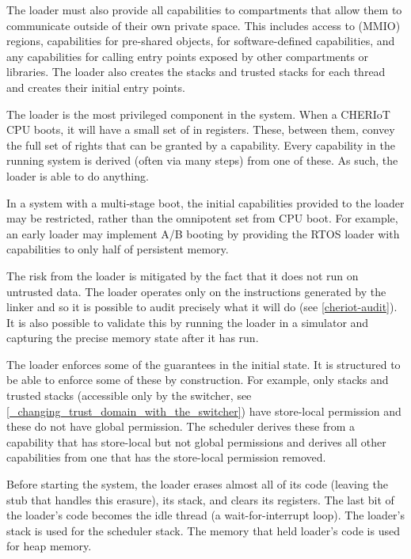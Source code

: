 The loader must also provide all capabilities to compartments that allow them to communicate outside of their own private space.
This includes access to  (MMIO) regions, capabilities for pre-shared objects, for software-defined capabilities, and any capabilities for calling entry points exposed by other compartments or libraries.
The loader also creates the stacks and trusted stacks for each thread and creates their initial entry points.

The loader is the most privileged component in the system.
When a CHERIoT CPU boots, it will have a small set of  in registers.
These, between them, convey the full set of rights that can be granted by a capability.
Every capability in the running system is derived (often via many steps) from one of these.
As such, the loader is able to do anything.

\begin{note}
In a system with a multi-stage boot, the initial capabilities provided to the loader may be restricted, rather than the omnipotent set from CPU boot.
For example, an early loader may implement A/B booting by providing the RTOS loader with capabilities to only half of persistent memory.
\end{note}

The risk from the loader is mitigated by the fact that it does not run on untrusted data.
The loader operates only on the instructions generated by the linker and so it is possible to audit precisely what it will do (see \ref{cheriot-audit}).
It is also possible to validate this by running the loader in a simulator and capturing the precise memory state after it has run.

The loader enforces some of the guarantees in the initial state.
It is structured to be able to enforce some of these by construction.
For example, only stacks and trusted stacks (accessible only by the switcher, see \ref{_changing_trust_domain_with_the_switcher}) have store-local permission and these do not have global permission.
The scheduler derives these from a capability that has store-local but not global permissions and derives all other capabilities from one that has the store-local permission removed.

Before starting the system, the loader erases almost all of its code (leaving the stub that handles this erasure), its stack, and clears its registers.
The last bit of the loader's code becomes the idle thread (a wait-for-interrupt loop).
The loader's stack is used for the scheduler stack.
The memory that held loader's code is used for heap memory.

